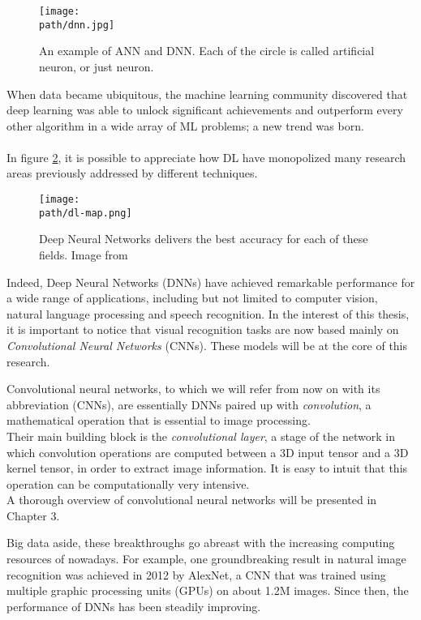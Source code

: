 \begin{figure}[h!]
 \centering
 \texttt{[image: \\path/dnn.jpg]} 
 \caption{An example of ANN and DNN. Each of the circle is called artificial neuron, or just neuron.}
 \label{fig:dnn}
\end{figure}

 When data became ubiquitous, the machine learning community  discovered that deep learning was able to unlock significant achievements and outperform every other algorithm in a wide array of ML problems; a new trend was born. 
 \\
 \\
In figure \ref{fig:dl-map}, it is possible to appreciate how DL have monopolized many research areas previously addressed by different techniques.
 
 \begin{figure}[h!]
 \centering
 \texttt{[image: \\path/dl-map.png]} 
 \caption{Deep Neural Networks delivers the best accuracy for each of these fields. Image from \parencite{cnn-design}}
 \label{fig:dl-map}
\end{figure}
 
  Indeed, Deep Neural Networks (DNNs) have achieved remarkable performance for a wide range of applications, including but not limited to computer vision, natural language processing and speech recognition. In the interest of this thesis, it is important to notice that visual recognition tasks are now based mainly on \emph{Convolutional Neural Networks} (CNNs). These models will be at the core of this research. 
  \newline 
  
 
 Convolutional neural networks, to which we will refer from now on with its abbreviation (CNNs), are essentially DNNs paired up with \emph{convolution}, a mathematical operation that is essential to image processing. \\
 Their main building block is the \emph{convolutional layer}, a stage of the network in which convolution operations are computed between a 3D input tensor and a 3D kernel tensor, in order to extract image information. It is easy to intuit that this operation can be computationally very intensive.
 \\
 A thorough overview of convolutional neural networks will be presented in Chapter 3.
 \newline
 
 Big data aside, these breakthroughs go abreast with the increasing computing resources of nowadays. For example, one groundbreaking result in natural image recognition was achieved in 2012 by AlexNet\parencite{alexnet}, a CNN that was trained using multiple graphic processing units (GPUs) on about 1.2M images. Since then, the performance of DNNs has been steadily improving. 
 \newline
 
